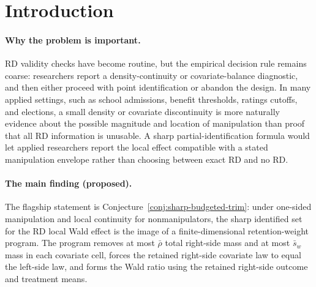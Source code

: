 \documentclass[11pt]{article}
\theoremstyle{definition}
\theoremstyle{plain}
\theoremstyle{remark}
\begin{document}
\begin{abstract}
Regression discontinuity analyses often treat a McCrary density jump as a binary diagnostic:
either the design is kept as a point-identified Lee-style RD or discarded as manipulated.
Gerard, Rokkanen, and Rothe give sharp bounds when one-sided manipulation identifies an
exact manipulator share, while covariate-adjusted Lee-bound work shows that conditional
trimming can be much sharper than unconditional trimming.  This proposal asks for the sharp
identified interval for the RD local Wald effect when the density jump is used only as an
upper envelope on total manipulation and predetermined covariates impose cellwise upper
bounds on the manipulator share.  The proposed kernel is that the tight interval is a
budgeted conditional trimming problem whose endpoint allocation couples outcome tails,
first-stage tails, and covariate cells; it is not obtained by plugging the largest allowed
share into the cell-cap-free exact-share formula.  Resolving this would turn manipulation
tests into a sensitivity-analysis object with a sharp no-manipulation face that recovers
the Lee RD point estimand.
\end{abstract}

\section{Introduction}
\paragraph{Why the problem is important.}
RD validity checks have become routine, but the empirical decision rule remains coarse:
researchers report a density-continuity or covariate-balance diagnostic, and then either
proceed with point identification or abandon the design.  In many applied settings, such as
school admissions, benefit thresholds, ratings cutoffs, and elections, a small density or
covariate discontinuity is more naturally evidence about the possible magnitude and location
of manipulation than proof that all RD information is unusable.  A sharp partial-identification
formula would let applied researchers report the local effect compatible with a stated
manipulation envelope rather than choosing between exact RD and no RD.

\paragraph{The main finding (proposed).}
The flagship statement is Conjecture~\ref{conj:sharp-budgeted-trim}: under one-sided
manipulation and local continuity for nonmanipulators, the sharp identified set for the RD
local Wald effect is the image of a finite-dimensional retention-weight program.  The
program removes at most \(\bar\rho\) total right-side mass and at most \(\bar s_w\) mass in
each covariate cell, forces the retained right-side covariate law to equal the left-side
law, and forms the Wald ratio using the retained right-side outcome and treatment means.
\end{document}
